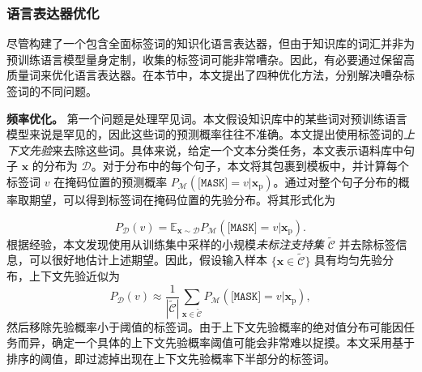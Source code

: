 \begin{table*}[!htbp]
    \centering
    \caption{扩展标签词的示例。}
    \label{tab:label_words_examples}
\end{table*}

\subsubsection{语言表达器优化}
\label{sec:refine}

尽管构建了一个包含全面标签词的知识化语言表达器，但由于知识库的词汇并非为预训练语言模型量身定制，收集的标签词可能非常嘈杂。因此，有必要通过保留高质量词来优化语言表达器。在本节中，本文提出了四种优化方法，分别解决嘈杂标签词的不同问题。

\textbf{频率优化。} 第一个问题是处理罕见词。本文假设知识库中的某些词对预训练语言模型来说是罕见的，因此这些词的预测概率往往不准确。本文提出使用标签词的\emph{上下文先验}来去除这些词。具体来说，给定一个文本分类任务，本文表示语料库中句子 $\mathbf{x}$ 的分布为 $\mathcal{D}$。对于分布中的每个句子，本文将其包裹到模板中，并计算每个标签词 $v$ 在掩码位置的预测概率 $P_{\mathcal{M}}(\texttt{[MASK]}\!\!\!=\!v|\mathbf{x}_{\text{p}})$。通过对整个句子分布的概率取期望，可以得到标签词在掩码位置的先验分布。将其形式化为

\begin{equation}
 P_{\mathcal{D}}(v)\! =\! \mathbb{E}_{\mathbf{x}\sim \mathcal{D}} P_{\mathcal{M}}(\texttt{[MASK]}\!\!\!=\!v|\mathbf{x}_{\text{p}}).
\end{equation}
根据经验，本文发现使用从训练集中采样的小规模\emph{未标注支持集} $\tilde{\mathcal{C}}$ 并去除标签信息，可以很好地估计上述期望。因此，假设输入样本 $\{\mathbf{x}\in \tilde{\mathcal{C}}\}$ 具有均匀先验分布，上下文先验近似为
\begin{equation}
    P_{\mathcal{D}}(v) \approx \frac{1}{|\tilde{\mathcal{C}}|} \sum_{\mathbf{x}\in \tilde{\mathcal{C}}} P_{\mathcal{M}}(\texttt{[MASK]}\!\!\!=\!v|\mathbf{x}_{\text{p}}),
\end{equation}
然后移除先验概率小于阈值的标签词。由于上下文先验概率的绝对值分布可能因任务而异，确定一个具体的上下文先验概率阈值可能会非常难以捉摸。本文采用基于排序的阈值，即过滤掉出现在上下文先验概率下半部分的标签词。

